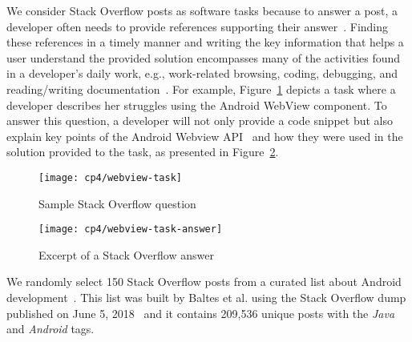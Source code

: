 We consider Stack Overflow posts as software tasks because to answer a post,
a developer often needs to provide references
supporting their answer~\cite{yazdaninia2021}.
Finding these references in a timely manner and writing the key information that helps a user understand 
 the provided solution encompasses many of the activities found in a developer's daily work, e.g., work-related browsing, coding, debugging, and reading/writing documentation~\cite{Meyer2017}.
For example, Figure~\ref{fig:webview-task} depicts a task where a developer describes her struggles using the Android WebView component.
To answer this question, a developer will not only provide a code snippet but also explain key points of the Android Webview API~\cite{apiWebView}
and how they were used in the solution provided to the task, 
as presented in Figure~\ref{fig:webview-task-answer}.


\begin{figure}
    \centering
    \texttt{[image: cp4/webview-task]}
    \caption{Sample Stack Overflow question}
    \label{fig:webview-task}
\end{figure}



\begin{figure}
    \centering
    \texttt{[image: cp4/webview-task-answer]}
    \caption{Excerpt of a Stack Overflow answer}
    \label{fig:webview-task-answer}
\end{figure}

We randomly select 150 Stack Overflow posts from a curated list about Android development~\cite{baltes2020}.
This list was built by Baltes et al. 
using the Stack Overflow dump published on June 5, 2018~\cite{baltes2019-rep, SOTorrent2019}
and it contains 209,536 unique posts with the \textit{Java} and \textit{Android} tags.
